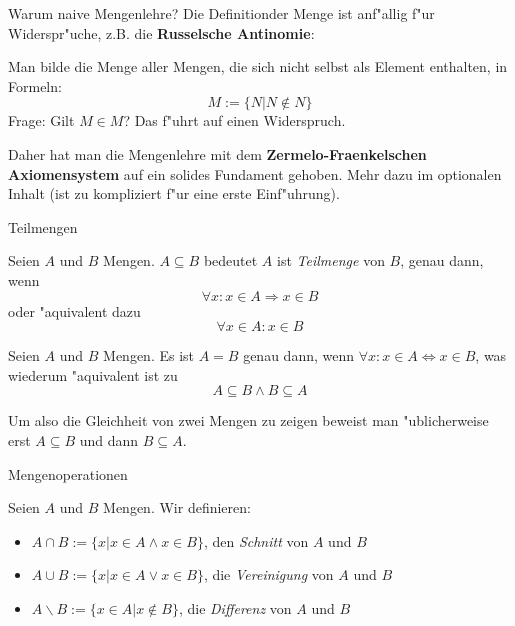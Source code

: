 \documentclass{beamer}
\begin{document}
\begin{frame}{Warum naive Mengenlehre?}
  Die \glqq Definition\grqq der Menge ist anf"allig f"ur Widerspr"uche, z.B. die \textbf{Russelsche Antinomie}:

  Man bilde die Menge aller Mengen, die sich nicht selbst als Element enthalten, in Formeln:
  \[M:=\{N|N\notin N\}\]
  Frage: Gilt $M\in M$? Das f"uhrt auf einen Widerspruch.
  
  Daher hat man die Mengenlehre mit dem \textbf{Zermelo-Fraenkelschen Axiomensystem} auf ein solides Fundament gehoben. Mehr dazu im optionalen Inhalt (ist zu kompliziert f"ur eine erste Einf"uhrung).
\end{frame}

\begin{frame}{Teilmengen}
  \begin{definition}[Teilmenge]
    Seien $A$ und $B$ Mengen. $A\subseteq B$ bedeutet $A$ ist \textit{Teilmenge} von $B$, genau dann, wenn 
    \[\forall x:x\in A\Rightarrow x\in B\] oder "aquivalent dazu \[\forall x\in A:x\in B\]
  \end{definition}
  
  \begin{lemma}
    Seien $A$ und $B$ Mengen. Es ist $A=B$ genau dann, wenn $\forall x:x\in A\Leftrightarrow x\in B$, was wiederum "aquivalent ist zu
    \[A\subseteq B\wedge B\subseteq A\]  
  \end{lemma}
  Um also die Gleichheit von zwei Mengen zu zeigen beweist man "ublicherweise erst $A\subseteq B$ und dann $B\subseteq A$.
\end{frame}

\begin{frame}{Mengenoperationen}
  \begin{definition}[Mengenoperationen]
    Seien $A$ und $B$ Mengen. Wir definieren:
    \begin{itemize}
      \item $A\cap B:=\{x|x\in A\wedge x\in B\}$, den \textit{Schnitt} von $A$ und $B$
      \item $A\cup B:=\{x|x\in A\vee x\in B\}$, die \textit{Vereinigung} von $A$ und $B$
      \item $A\backslash B:=\{x\in A|x\notin B\}$, die \textit{Differenz} von $A$ und $B$
    \end{itemize}
  \end{definition}
\end{frame}
\end{document}
